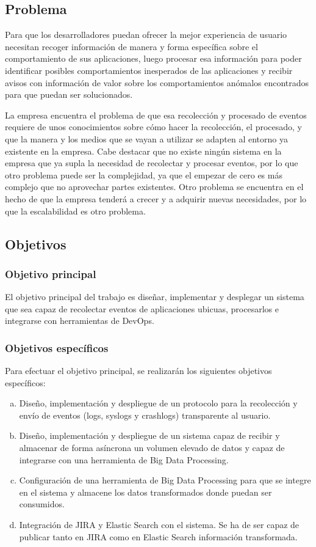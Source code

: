 \subsection{Problema}
Para que los desarrolladores puedan ofrecer la mejor experiencia de usuario necesitan recoger información de manera y forma específica sobre el comportamiento de sus aplicaciones, luego procesar esa información para poder identificar posibles comportamientos inesperados de las aplicaciones y recibir avisos con información de valor sobre los comportamientos anómalos encontrados para que puedan ser solucionados.

La empresa encuentra el problema de que esa recolección y procesado de eventos requiere de unos conocimientos sobre cómo hacer la recolección, el procesado, y que la manera y los medios que se vayan a utilizar se adapten al entorno ya existente en la empresa. Cabe destacar que no existe ningún sistema en la empresa que ya supla la necesidad de recolectar y procesar eventos, por lo que otro problema puede ser la complejidad, ya que el empezar de cero es más complejo que no aprovechar partes existentes. Otro problema se encuentra en el hecho de que la empresa tenderá a crecer y a adquirir nuevas necesidades, por lo que la escalabilidad es otro problema.

\subsection{Objetivos}
\subsubsection{Objetivo principal}
El objetivo principal del trabajo es diseñar, implementar y desplegar un sistema que sea capaz de recolectar eventos de aplicaciones ubicuas, procesarlos e integrarse con herramientas de DevOps.


\subsubsection{Objetivos específicos}
Para efectuar el objetivo principal, se realizarán los siguientes objetivos específicos:

\begin{enumerate}[a)]
	\item Diseño, implementación y despliegue de un protocolo para la recolección y envío de eventos (logs, syslogs y crashlogs) transparente al usuario.
	
	\item Diseño, implementación y despliegue de un sistema capaz de recibir y almacenar de forma asíncrona un volumen elevado de datos y capaz de integrarse con una herramienta de Big Data Processing.
	
	\item Configuración de una herramienta de Big Data Processing para que se integre en el sistema y almacene los datos transformados donde puedan ser consumidos.
	
	\item Integración de JIRA y Elastic Search con el sistema. Se ha de ser capaz de publicar tanto en JIRA como en Elastic Search información transformada.
\end{enumerate}

